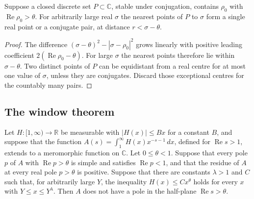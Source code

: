 \begin{lemma}\label{near}
Suppose a closed discrete set $P\subset\mathbb C$, stable under conjugation,
contains $\rho_0$ with $\operatorname{Re}\rho_0>\theta$.
For arbitrarily large real $\sigma$ the nearest points of $P$ to $\sigma$
form a single real point or a conjugate pair, at distance $r<\sigma-\theta$.
\end{lemma}

\begin{proof}
The difference $(\sigma-\theta)^2-|\sigma-\rho_0|^2$ grows linearly
with positive leading coefficient $2(\operatorname{Re}\rho_0-\theta)$.
For large $\sigma$ the nearest points therefore lie within $\sigma-\theta$.
Two distinct points of $P$ can be equidistant from a real centre for
at most one value of $\sigma$, unless they are conjugates. Discard those
exceptional centres for the countably many pairs.
\end{proof}

\subsection{The window theorem}\label{sec:win}

\begin{theorem}\label{engine}
Let $H\colon[1,\infty)\to\mathbb R$ be measurable with $\lvert H(x)\rvert\le Bx$ for a constant $B$, and suppose that the function $A(s)=\int_1^\infty H(x)x^{-s-1}\,dx$, defined for $\operatorname{Re}s>1$, extends to a meromorphic function on $\mathbb C$. Let $0\le\theta<1$. Suppose that every pole $p$ of $A$ with $\operatorname{Re}p>\theta$ is simple and satisfies $\operatorname{Re}p<1$, and that the residue of $A$ at every real pole $p>\theta$ is positive. Suppose that there are constants $\lambda>1$ and $C$ such that, for arbitrarily large $Y$, the inequality $H(x)\le Cx^\theta$ holds for every $x$ with $Y\le x\le Y^\lambda$. Then $A$ does not have a pole in the half-plane $\operatorname{Re}s>\theta$.
\end{theorem}

